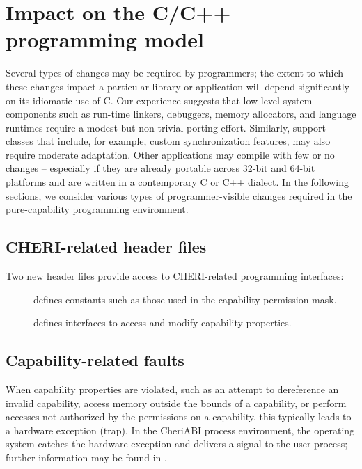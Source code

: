 \documentclass[12pt,twoside,openright,a4paper]{article}
\newcommand{\ccode}[1]{{\small\ttfamily{#1}}}
\newcommand{\pathname}[1]{{\ccode{#1}}}
\newcommand{\SIGPROT}{{\ccode{SIGPROT}}\xspace}
\begin{document}
%

\section{Impact on the C/C++ programming model}

Several types of changes may be required by programmers; the extent to which
these changes impact a particular library or application will depend
significantly on its idiomatic use of C.
Our experience suggests that low-level system components such as run-time
linkers, debuggers, memory allocators, and language runtimes require a modest
but non-trivial porting effort.
Similarly, support classes that include, for example, custom synchronization
features, may also require moderate adaptation.
Other applications may compile with few or no changes -- especially if they
are already portable across 32-bit and 64-bit platforms and are written in a contemporary C or C++ dialect.
In the following sections, we consider various types of programmer-visible
changes required in the pure-capability programming environment.

\subsection{CHERI-related header files}

Two new header files provide access to CHERI-related programming interfaces:

\begin{description}
\item[\pathname{cheri/cheri.h}] defines constants such as those used in the
  capability permission mask.

\item[\pathname{cheri/cheric.h}] defines interfaces to access and
  modify capability properties.
\end{description}

\subsection{Capability-related faults}
\label{sec:faults}

When capability properties are violated, such as an attempt to dereference an
invalid capability, access memory outside the bounds of a capability, or perform
accesses not authorized by the permissions on a capability, this typically
leads to a hardware exception (trap).
In the CheriABI process environment, the operating system catches the hardware
exception and delivers a \SIGPROT signal to the user process;
further information may be found in .
\end{document}
